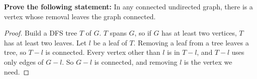 \begin{Exercise}[title={Leaf Removal}, label={ex:proofs_leaf}]
\textbf{Prove the following statement:}
In any connected undirected graph, there is a vertex whose removal leaves the graph connected.
\end{Exercise}
\begin{Answer}[ref={ex:proofs_leaf}]
\begin{proof}
Build a DFS tree $T$ of $G$. $T$ spans $G$, so if $G$ has at least two vertices, $T$ has at least two leaves. Let $l$ be a leaf of $T$. Removing a leaf from a tree leaves a tree, so $T - l$ is connected. Every vertex other than $l$ is in $T - l$, and $T - l$ uses only edges of $G - l$. So $G - l$ is connected, and removing $l$ is the vertex we need.
\end{proof}
\end{Answer}

